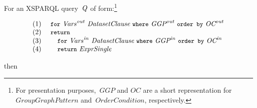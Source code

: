 For an XSPARQL query~$\envElem{Q}{}$ of form:\footnote{For presentation purposes,~$\mathit{GGP}$ and $\mathit{OC}$ are a
  short representation for~$\mathit{GroupGraphPattern}$ and~$\mathit{OrderCondition}$, respectively.}
%
\begin{queryF}
\[\begin{array}{l}
  \mathrm{(1)~~~~}\FOR~\gsup{\Vars}{out}~\DatasetClause~\WHERE~\gsup{\GroupGraphPattern}{out}~\ORDERBY~\gsup{\OrderCondition}{out}\\
  \mathrm{(2)~~~~}\RETURN\\
  \mathrm{(3)~~~~}\quad \FOR~\gsup{\Vars}{in}~\DatasetClause~\WHERE~\gsup{\GroupGraphPattern}{in}~\ORDERBY~\gsup{\OrderCondition}{in}\\
  \mathrm{(4)~~~~}\quad \ReturnExpr
\end{array}\]
\label{eq:expr_sr}
\end{queryF}%
%
\noindent then 
%
